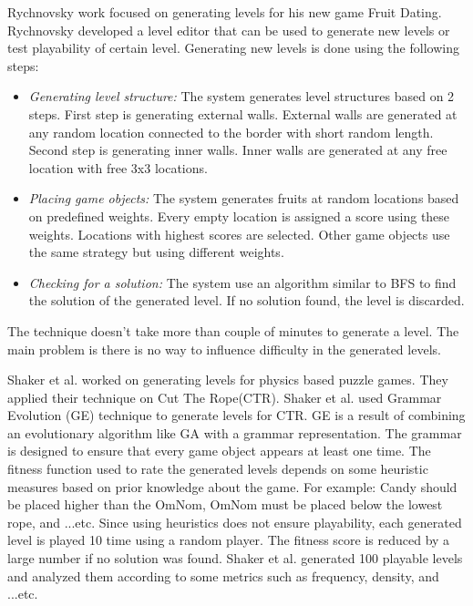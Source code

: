 \documentclass[letterpaper]{article}
\begin{document}
Rychnovsky\cite{fruitDatingPCG} work focused on generating levels for his new game Fruit Dating\cite{fruitDating}. Rychnovsky developed a level editor that can be used to generate new levels or test playability of certain level. Generating new levels is done using the following steps: 
\begin{itemize}
	\item \emph{Generating level structure:} The system generates level structures based on 2 steps. First step is generating external walls. External walls are generated at any random location connected to the border with short random length. Second step is generating inner walls. Inner walls are generated at any free location with free 3x3 locations.
	\item \emph{Placing game objects:} The system generates fruits at random locations based on predefined weights. Every empty location is assigned a score using these weights. Locations with highest scores are selected. Other game objects use the same strategy but using different weights.
	\item \emph{Checking for a solution:} The system use an algorithm similar to BFS to find the solution of the generated level. If no solution found, the level is discarded.
\end{itemize}
The technique doesn't take more than couple of minutes to generate a level. The main problem is there is no way to influence difficulty in the generated levels.\\\par

Shaker et al.\cite{ctrAutomaticGeneration} worked on generating levels for physics based puzzle games. They applied their technique on Cut The Rope(CTR)\cite{cutTheRope}. Shaker et al. used Grammar Evolution (GE) technique to generate levels for CTR. GE is a result of combining an evolutionary algorithm like GA with a grammar representation. The grammar is designed to ensure that every game object appears at least one time. The fitness function used to rate the generated levels depends on some heuristic measures based on prior knowledge about the game. For example: Candy should be placed higher than the OmNom, OmNom must be placed below the lowest rope, and ...etc. Since using heuristics does not ensure playability, each generated level is played 10 time using a random player. The fitness score is reduced by a large number if no solution was found. Shaker et al. generated 100 playable levels and analyzed them according to some metrics such as frequency, density, and ...etc.\\\par
\end{document}
